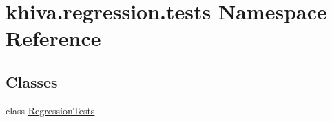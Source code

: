 \hypertarget{namespacekhiva_1_1regression_1_1tests}{}\section{khiva.\+regression.\+tests Namespace Reference}
\label{namespacekhiva_1_1regression_1_1tests}
\subsection*{Classes}
\begin{DoxyCompactItemize}
\item 
class \mbox{\hyperlink{classkhiva_1_1regression_1_1tests_1_1_regression_tests}{Regression\+Tests}}
\end{DoxyCompactItemize}
